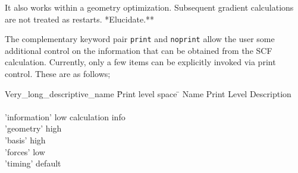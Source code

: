 
  It also works within a geometry optimization. Subsequent gradient 
  calculations are not treated as restarts.
\Large  **Elucidate.**
\normalsize


The complementary keyword pair \verb+print+ and \verb+noprint+ allow the 
user some additional control on the information that can be obtained from
the SCF calculation.  Currently, only a few items can be explicitly invoked
via print control.  These are as follows;
 

\begin{tabbing}
  Very\_long\_descriptive\_name \= Print level space \= \kill
  Name                   \> Print Level \> Description \\
                         \>        \> \\
        'information'   \>        low  \> calculation info\\
        'geometry'    \>          high \> \\
        'basis'        \>         high \> \\
        'forces'   \>             low \> \\
        'timing'   \>             default \> 
\end{tabbing}


